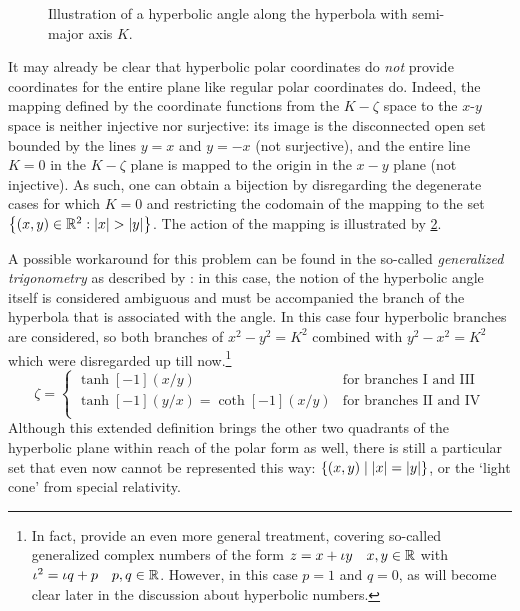 \begin{figure}[ht!]
    \centering
    
    \caption{Illustration of a hyperbolic angle along the hyperbola with semi-major axis \(K\).}
    \label{fig:hyperbolic_angle}
\end{figure}
It may already be clear that hyperbolic polar coordinates do \emph{not} provide coordinates for the entire plane like regular polar coordinates do. Indeed, the mapping defined by the coordinate functions from the \(K-\zeta\) space to the \(x\)-\(y\) space is neither injective nor surjective: its image is the disconnected open set bounded by the lines \(y = x\) and \(y = -x\) (not surjective), and the entire line \(K = 0\) in the \(K-\zeta\) plane is mapped to the origin in the \(x-y\) plane (not injective). As such, one can obtain a bijection by disregarding the degenerate cases for which \(K = 0\) and restricting the codomain of the mapping to the set \(\qty{(x, y) \in \real^2: \abs{x} > \abs{y}}\). The action of the mapping is illustrated by \cref{fig:polar_coords}.
\begin{figure}[ht]
    \centering
    
    \caption{}
    \label{fig:polar_coords}
\end{figure}

A possible workaround for this problem can be found in the so-called \emph{generalized trigonometry} as described by \citet{Harkin2004}: in this case, the notion of the hyperbolic angle itself is considered ambiguous and must be accompanied the branch of the hyperbola that is associated with the angle. In this case four hyperbolic branches are considered, so both branches of \(x^2 - y^2 = K^2\) combined with \(y^2 - x^2 = K^2\) which were disregarded up till now.\footnote{In fact, \citeauthor{Harkin2004} provide an even more general treatment, covering so-called generalized complex numbers of the form \(z = x + \iota y\quad x, y \in \mathbb{R}\) with \(\iota^2 = \iota q + p\quad p, q \in \mathbb{R}\). However, in this case \(p = 1\) and \(q = 0\), as will become clear later in the discussion about hyperbolic numbers.}
\begin{equation}
    \zeta = 
    \begin{cases}
        \tanh[-1](x/y) & \text{for branches I and III}\\
        \tanh[-1](y/x) = \coth[-1](x/y) & \text{for branches II and IV}\\
    \end{cases}
\end{equation}
Although this extended definition brings the other two quadrants of the hyperbolic plane within reach of the polar form as well, there is still a particular set that even now cannot be represented this way: \(\qty{(x, y)\mid \abs{x} = \abs{y}}\), or the `light cone' from special relativity.

